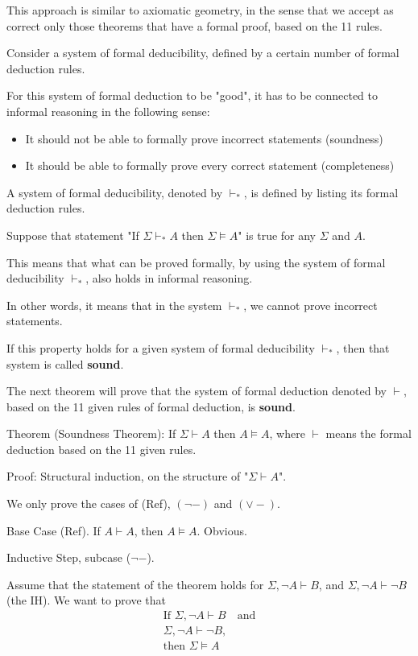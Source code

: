 \documentclass{article}
\begin{document}
This approach is similar to axiomatic geometry, in the sense that we accept as correct only those theorems that have a formal proof, based on the 11 rules.

Consider a system of formal deducibility, defined by a certain number of formal deduction rules.

For this system of formal deduction to be "good", it has to be connected to informal reasoning in the following sense:
\begin{itemize}
    \item It should not be able to formally prove incorrect statements (soundness)
    \item It should be able to formally prove every correct statement (completeness)
\end{itemize}

A system of formal deducibility, denoted by $\vdash_{*}$, is defined by listing its formal deduction rules.

Suppose that statement "If $\Sigma \vdash_{*} A$ then $\Sigma \vDash A$" is true for any $\Sigma$ and $A$. 

This means that what can be proved formally, by using the system of formal deducibility $\vdash_{*}$, also holds in informal reasoning. 

In other words, it means that in the system $\vdash_*$, we cannot prove incorrect statements. 

If this property holds for a given system of formal deducibility $\vdash_*$, then that system is called \textbf{sound}. 

The next theorem will prove that the system of formal deduction denoted by $\vdash$, based on the 11 given rules of formal deduction, is \textbf{sound}.

Theorem (Soundness Theorem): If $\Sigma \vdash A$ then $A \vDash A$, where $\vdash$ means the formal deduction based on the 11 given rules.

Proof: Structural induction, on the structure of "$\Sigma \vdash A$". 

We only prove the cases of (Ref), $(\neg -)$ and $(\vee -)$.

Base Case (Ref). If $A \vdash A$, then $A \vDash A$. Obvious. 

Inductive Step, subcase ($\neg -$). 

Assume that the statement of the theorem holds for $\Sigma, \neg A \vdash B$, and $\Sigma, \neg A \vdash \neg B$ (the IH). We want to prove that
\begin{align*}
\text{If } \Sigma, \neg A \vdash B \quad \text{and} \\
\Sigma, \neg A \vdash \neg B, \\
\text{then } \Sigma \vDash A
\end{align*}
\end{document}
